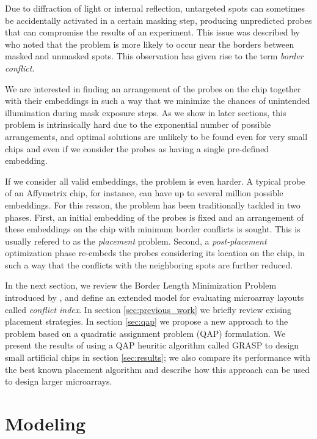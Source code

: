 \documentclass{bioinfo}
\begin{document}
Due to diffraction of light or internal reflection, untargeted spots can sometimes be accidentally activated in a certain masking step, producing unpredicted probes that can compromise the results of an experiment. This issue was described by \citealp{FODOR91} who noted that the problem is more likely to occur near the borders between masked and unmasked spots. This observation has given rise to the term \emph{border conflict}.

We are interested in finding an arrangement of the probes on the chip together with their embeddings in such a way that we minimize the chances of unintended illumination during mask exposure steps. As we show in later sections, this problem is intrinsically hard due to the exponential number of possible arrangements, and optimal solutions are unlikely to be found even for very small chips and even if we consider the probes as having a single pre-defined embedding.

If we consider all valid embeddings, the problem is even harder. A typical probe of an Affymetrix chip, for instance, can have up to several million possible embeddings. For this reason, the problem has been traditionally tackled in two phases. First, an initial embedding of the probes is fixed and an arrangement of these embeddings on the chip with minimum border conflicts is sought. This is usually refered to as the \emph{placement} problem. Second, a \emph{post-placement} optimization phase re-embeds the probes considering its location on the chip, in such a way that the conflicts with the neighboring spots are further reduced.

In the next section, we review the Border Length Minimization Problem introduced by \citealp{HANNENHALLI02}, and define an extended model for evaluating microarray layouts called \emph{conflict index}. In section \ref{sec:previous_work} we briefly review exising placement strategies. In section \ref{sec:qap} we propose a new approach to the problem based on a quadratic assignment problem (QAP) formulation. We present the results of using a QAP heuritic algorithm called GRASP to design small artificial chips in section \ref{sec:results}; we also compare its performance with the best known placement algorithm and describe how this approach can be used to design larger microarrays.

\section{Modeling}
\label{sec:modelling}
\end{document}
